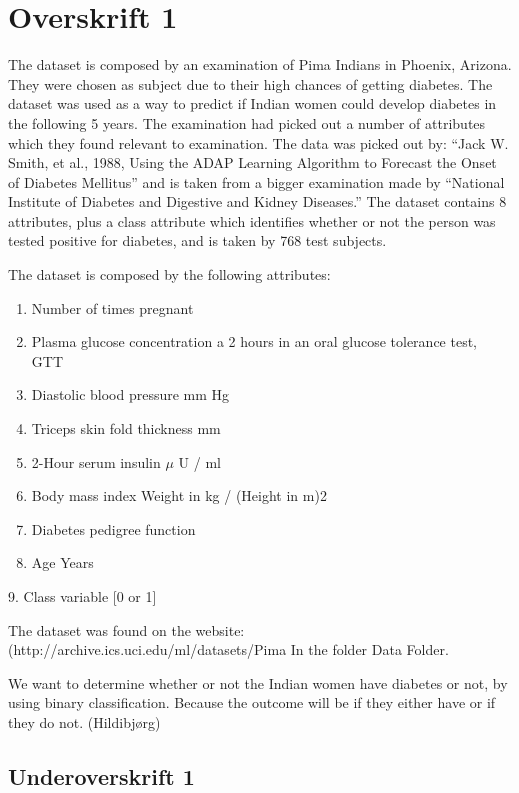 \section{Overskrift 1}

The dataset is composed by an examination of Pima Indians in Phoenix, Arizona.
They were chosen as subject due to their high chances of getting diabetes.
The dataset was used as a way to predict if Indian women could develop diabetes in the following 5 years.
The examination had picked out a number of attributes which they found relevant to examination.
The data was picked out by: “Jack W. Smith, et al., 1988, Using the ADAP Learning Algorithm to Forecast the Onset of Diabetes Mellitus”
and is taken from a bigger examination made by “National Institute of Diabetes and Digestive and Kidney Diseases.”
The dataset contains 8 attributes, plus a class attribute which identifies whether or not the person was tested positive for diabetes, and is taken by 768 test subjects.

The dataset is composed by the following attributes:
\begin{enumerate}
\item Number of times pregnant
\item Plasma glucose concentration a 2 hours in an oral glucose tolerance test, GTT
\item Diastolic blood pressure mm Hg
\item Triceps skin fold thickness mm
\item 2-Hour serum insulin $\mu$ U / ml
\item Body mass index Weight in kg / (Height in m)2
\item Diabetes pedigree function
\item Age Years
\end{enumerate}

9. Class variable [0 or 1]

The dataset was found on the website: (http://archive.ics.uci.edu/ml/datasets/Pima%
In the folder Data Folder.

We want to determine whether or not the Indian women have diabetes or not, by using binary classification.
Because the outcome will be if they either have or if they do not.
(Hildibjørg)

\subsection{Underoverskrift 1}

